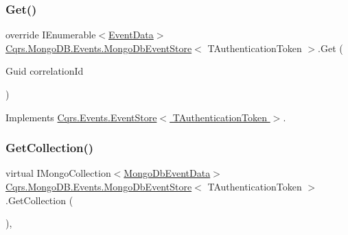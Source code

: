 \subsubsection{\texorpdfstring{Get()}{Get()}\hspace{0.1cm}{\footnotesize\ttfamily [2/2]}}
{\footnotesize\ttfamily override I\+Enumerable$<$\hyperlink{classCqrs_1_1Events_1_1EventData}{Event\+Data}$>$ \hyperlink{classCqrs_1_1MongoDB_1_1Events_1_1MongoDbEventStore}{Cqrs.\+Mongo\+D\+B.\+Events.\+Mongo\+Db\+Event\+Store}$<$ T\+Authentication\+Token $>$.Get (\begin{DoxyParamCaption}\item[{Guid}]{correlation\+Id }\end{DoxyParamCaption})\hspace{0.3cm}{\ttfamily [virtual]}}



Implements \hyperlink{classCqrs_1_1Events_1_1EventStore_a0096646f5dff730b0041b9469719c420_a0096646f5dff730b0041b9469719c420}{Cqrs.\+Events.\+Event\+Store$<$ T\+Authentication\+Token $>$}.

\mbox{\label{classCqrs_1_1MongoDB_1_1Events_1_1MongoDbEventStore_aa6a9499aa1dcde55d82d8e0f3b5bd077_aa6a9499aa1dcde55d82d8e0f3b5bd077}} 
\subsubsection{\texorpdfstring{Get\+Collection()}{GetCollection()}}
{\footnotesize\ttfamily virtual I\+Mongo\+Collection$<$\hyperlink{classCqrs_1_1MongoDB_1_1Events_1_1MongoDbEventData}{Mongo\+Db\+Event\+Data}$>$ \hyperlink{classCqrs_1_1MongoDB_1_1Events_1_1MongoDbEventStore}{Cqrs.\+Mongo\+D\+B.\+Events.\+Mongo\+Db\+Event\+Store}$<$ T\+Authentication\+Token $>$.Get\+Collection (\begin{DoxyParamCaption}{ }\end{DoxyParamCaption})\hspace{0.3cm}{\ttfamily [protected]}, {\ttfamily [virtual]}}

\mbox{\label{classCqrs_1_1MongoDB_1_1Events_1_1MongoDbEventStore_a13f6823671d7cb9c042d8f7156a51b89_a13f6823671d7cb9c042d8f7156a51b89}} 
